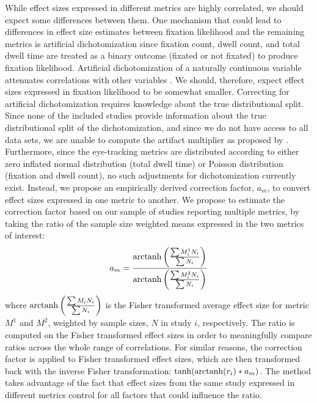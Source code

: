 While effect sizes expressed in different metrics are highly correlated, we should expect some differences between them. One mechanism that could lead to differences in effect size estimates between fixation likelihood and the remaining metrics is artificial dichotomization since fixation count, dwell count, and total dwell time are treated as a binary outcome (fixated or not fixated) to produce fixation likelihood. Artificial dichotomization of a naturally continuous variable attenuates correlations with other variables \citep{hunter2004a}. We should, therefore, expect effect sizes expressed in fixation likelihood to be somewhat smaller. Correcting for artificial dichotomization requires knowledge about the true distributional split. Since none of the included studies provide information about the true distributional split of the dichotomization, and since we do not have access to all data sets, we are unable to compute the artifact multiplier as proposed by \cite{hunter2004a}. Furthermore, since the eye-tracking metrics are distributed according to either zero inflated normal distribution (total dwell time) or Poisson distribution (fixation and dwell count), no such adjustments for dichotomization currently exist. Instead, we propose an empirically derived correction factor, $a_m$, to convert effect sizes expressed in one metric to another. We propose to estimate the correction factor based on our sample of studies reporting multiple metrics, by taking the ratio of the sample size weighted means expressed in the two metrics of interest:
%
\begin{equation}
\label{eq:metrics_correction}
a_m = \frac{\operatorname{arctanh} \left( \frac{\sum M_i^1 N_i}{\sum N_i} \right)}{\operatorname{arctanh} \left( \frac{\sum M_i^2 N_i}{\sum N_i} \right)}
\end{equation}
%
where $\operatorname{arctanh} \left( \frac{\sum M_i N_i}{\sum N_i} \right)$ is the Fisher transformed average effect size for metric $M^1$ and $M^2$, weighted by sample sizes, $N$ in study $i$, respectively. The ratio is computed on the Fisher transformed effect sizes in order to meaningfully compare ratios across the whole range of correlations. For similar reasons, the correction factor is applied to Fisher transformed effect sizes, which are then transformed back with the inverse Fisher transformation: $\tanh(\operatorname{arctanh}(r_i)*a_m)$. The method takes advantage of the fact that effect sizes from the same study expressed in different metrics control for all factors that could influence the ratio.\\    

